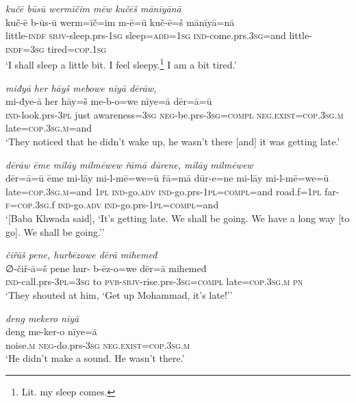 \ea \label{BP.183}
\textit{kučē būsū wermīčim mēw kučēš mānīyānā} \\ 
\gll kuč-ē b-ūs-ū werm=īč=im m-ē=ū kuč-ē=š mānīyā=nā \\ 
 little\textsc{-indf} \textsc{sbjv-}sleep.prs\textsc{-\textsc{1sg}} sleep\textsc{=add}\textsc{=\textsc{1sg}} \textsc{ind-}come.prs\textsc{.3sg}=and little\textsc{-indf}\textsc{=3sg} tired\textsc{=cop}\textsc{.\textsc{1sg}} \\ 
\glt `I shall sleep a little bit. I feel sleepy.\footnote{Lit. my sleep comes.} I am a bit tired.'
\z 
 
\ea \label{BP.190}
\textit{miđyā her hāyš mebowe nīyā dērāw,} \\ 
\gll mi-đye-ā her hāy=š me-b-o=we nīye=ā dēr=ā=ū \\ 
 \textsc{ind-}look.prs\textsc{-3pl} just awareness\textsc{=3sg} \textsc{neg-}be.prs\textsc{-3sg}\textsc{=compl} \textsc{\textsc{neg.}exist}\textsc{=cop}\textsc{.3sg}\textsc{.m} late\textsc{=cop}\textsc{.3sg}\textsc{.m}=and \\ 
\glt `They noticed that he didn’t wake up, he wasn’t there [and] it was getting late.'
\z 
 
\ea \label{BP.191}
\textit{dērāw ēme milāy milmēwew řāmā dūrene, milāy milmēwew} \\ 
\gll dēr=ā=ū ēme mi-lāy mi-l-mē=we=ū řā=mā dūr-e=ne mi-lāy mi-l-mē=we=ū \\ 
 late\textsc{=cop}\textsc{.3sg}\textsc{.m}=and \textsc{1pl} \textsc{ind-}go\textsc{.adv} \textsc{ind-}go.prs\textsc{-\textsc{1pl}}\textsc{=compl}=and road.f\textsc{=\textsc{1pl}} far\textsc{-f}\textsc{=cop}\textsc{.3sg}.f \textsc{ind-}go\textsc{.adv} \textsc{ind-}go.prs\textsc{-\textsc{1pl}}\textsc{=compl}=and \\ 
\glt `[Baba Khwada said], ‘It’s getting late. We shall be going. We have a long way [to go]. We shall be going.’'
\z 
 
\ea \label{BP.192}
\textit{čiřāš pene, hurbēzowe dērā mihemeđ} \\ 
\gll ∅-čiř-ā=š pene hur- b-ēz-o=we dēr=ā mihemeđ \\ 
 \textsc{ind-}call.prs\textsc{-3pl}\textsc{=3sg} to \textsc{pvb-}\textsc{sbjv-}rise.prs\textsc{-3sg}\textsc{=compl} late\textsc{=cop}\textsc{.3sg}\textsc{.m} \textsc{pn} \\ 
\glt `They shouted at him, ‘Get up Mohammad, it’s late!’'
\z 
 
\ea \label{BP.193}
\textit{deng mekero nīyā} \\ 
\gll deng me-ker-o nīye=ā \\ 
 noise\textsc{.m} \textsc{neg-}do.prs\textsc{-3sg} \textsc{\textsc{neg.}exist}\textsc{=cop}\textsc{.3sg}\textsc{.m} \\ 
\glt `He didn’t make a sound. He wasn’t there.'
\z 
 
